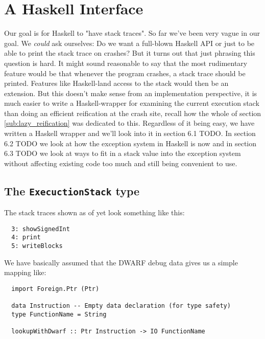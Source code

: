 \chapter{A Haskell Interface}

Our goal is for Haskell to "have stack traces". So far we've been
very vague in our goal. We \emph{could} ask ourselves: Do we want a
full-blown Haskell API or just to be able to print the stack trace on
crashes? %
But it turns out that just phrasing this question is hard.
It might sound reasonable to say that the most rudimentary feature
would be that whenever the program crashes, a stack trace should be
printed. Features like Haskell-land access to the stack would then
be an extension. But this doesn't make sense from an implementation
perspective, it is much easier to write a Haskell-wrapper for examining
the current execution stack than doing an efficient reification at the
crash site, recall how the whole of section \ref{sub:lazy_reification}
was dedicated to this. Regardless of it being easy, we have written a
Haskell wrapper and we'll look into it in section 6.1 TODO. In section
6.2 TODO we look at how the exception system in Haskell is now and
in section 6.3 TODO we look at ways to fit in a stack value into the
exception system without affecting existing code too much and still
being convenient to use.


\section{The \texttt{ExecuctionStack} type}

The stack traces shown as of yet look something like this:

\begin{verbatim}
  3: showSignedInt
  4: print
  5: writeBlocks
\end{verbatim}

We have basically assumed that the DWARF debug data gives us a simple
mapping like:

\begin{verbatim}
  import Foreign.Ptr (Ptr)

  data Instruction -- Empty data declaration (for type safety)
  type FunctionName = String

  lookupWithDwarf :: Ptr Instruction -> IO FunctionName
\end{verbatim}

